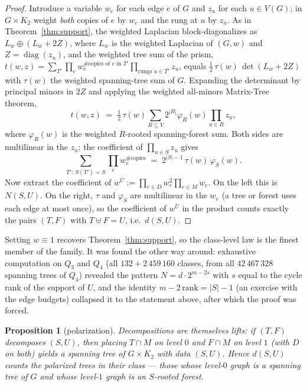 \documentclass[11pt]{amsart}
\newtheorem{proposition}[theorem]{Proposition}
\theoremstyle{definition}
\begin{document}
\begin{proof}
Introduce a variable $w_e$ for each edge $e$ of $G$ and $z_u$ for each
$u \in V(G)$; in $G\times K_2$ weight \emph{both} copies of $e$ by $w_e$
and the rung at $u$ by $z_u$. As in Theorem~\ref{thm:support}, the weighted
Laplacian block-diagonalizes as $L_w \oplus (L_w + 2Z)$, where $L_w$ is the
weighted Laplacian of $(G,w)$ and $Z = \operatorname{diag}(z_u)$, and the
weighted tree sum of the prism,
$t(w,z) = \sum_{T'} \prod_e w_e^{\#\text{copies of $e$ in } T'}
\prod_{\text{rungs } u \in T'} z_u$, equals
$\tfrac12\,\tau(w)\,\det(L_w + 2Z)$ with $\tau(w)$ the weighted
spanning-tree sum of $G$. Expanding the determinant by principal minors in
$2Z$ and applying the weighted all-minors Matrix-Tree theorem,
\[
  t(w,z) \;=\; \tfrac12\,\tau(w) \sum_{R \subseteq V} 2^{|R|}
  \varphi_R(w) \prod_{u\in R} z_u,
\]
where $\varphi_R(w)$ is the weighted $R$-rooted spanning-forest sum. Both
sides are multilinear in the $z_u$; the coefficient of
$\prod_{u\in S} z_u$ gives
\[
  \sum_{T' :\, S(T') = S} \prod_e w_e^{\#\text{copies}}
  \;=\; 2^{|S|-1}\,\tau(w)\,\varphi_S(w).
\]
Now extract the coefficient of $w^U := \prod_{e \in D} w_e^2
\prod_{e\in M} w_e$. On the left this is $N(S,U)$. On the right, $\tau$ and
$\varphi_S$ are multilinear in the $w_e$ (a tree or forest uses each edge
at most once), so the coefficient of $w^U$ in the product counts exactly
the pairs $(T, F)$ with $T \uplus F = U$, i.e.\ $d(S,U)$.
\end{proof}

Setting $w \equiv 1$ recovers Theorem~\ref{thm:support}, so the class-level
law is the finest member of the family. It was found the other way around:
exhaustive computation on $Q_3$ and $Q_4$ (all $132 + 2\,459\,160$ classes,
from all $42\,467\,328$ spanning trees of $Q_4$) revealed the pattern
$N = d\cdot 2^{m-2s}$ with $s$ equal to the cycle rank of the support of
$U$, and the identity $m - 2\,\mathrm{rank} = |S|-1$ (an exercise with the
edge budgets) collapsed it to the statement above, after which the proof
was forced.

\begin{proposition}[polarization]\label{prop:polar}
Decompositions are themselves lifts: if $(T,F)$ decomposes $(S,U)$, then
placing $T\cap M$ on level $0$ and $F \cap M$ on level $1$ (with $D$ on
both) yields a spanning tree of $G\times K_2$ with data $(S,U)$. Hence
$d(S,U)$ counts the \emph{polarized} trees in their class --- those whose
level-$0$ graph is a spanning tree of $G$ and whose level-$1$ graph is an
$S$-rooted forest.
\end{proposition}
\end{document}
